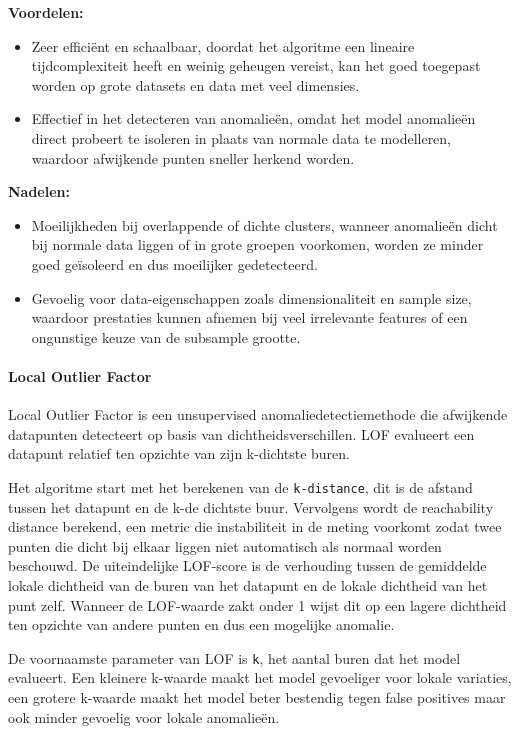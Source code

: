 \textbf{Voordelen:}
\begin{itemize}
    \item Zeer efficiënt en schaalbaar, doordat het algoritme een lineaire
    tijdcomplexiteit heeft en weinig geheugen vereist, kan het goed toegepast
    worden op grote datasets en data met veel dimensies.
    \item Effectief in het detecteren van anomalieën, omdat het model anomalieën
    direct probeert te isoleren in plaats van normale data te modelleren,
    waardoor afwijkende punten sneller herkend worden.
\end{itemize}

\textbf{Nadelen:}
\begin{itemize}
    \item Moeilijkheden bij overlappende of dichte clusters, wanneer anomalieën
    dicht bij normale data liggen of in grote groepen voorkomen, worden ze minder
    goed geïsoleerd en dus moeilijker gedetecteerd.
    \item Gevoelig voor data-eigenschappen zoals dimensionaliteit en sample size,
    waardoor prestaties kunnen afnemen bij veel irrelevante features of een
    ongunstige keuze van de subsample grootte.
\end{itemize}

\medskip

\paragraph{Local Outlier Factor}

Local Outlier Factor is een unsupervised anomaliedetectiemethode die afwijkende datapunten detecteert op basis van dichtheidsverschillen. LOF evalueert een datapunt relatief ten opzichte van zijn k-dichtste buren.

Het algoritme start met het berekenen van de \texttt{k-distance}, dit is de afstand tussen het datapunt en de k-de dichtste buur. 
Vervolgens wordt de reachability distance berekend, een metric die instabiliteit in de meting voorkomt zodat twee punten die dicht bij elkaar liggen niet automatisch als normaal worden beschouwd. 
De uiteindelijke LOF-score is de verhouding tussen de gemiddelde lokale dichtheid van de buren van het datapunt en de lokale dichtheid van het punt zelf. 
Wanneer de LOF-waarde zakt onder 1 wijst dit op een lagere dichtheid ten opzichte van andere punten en dus een mogelijke anomalie\autocite{Mavuduru2026}.

De voornaamste parameter van LOF is \texttt{k}, het aantal buren dat het model evalueert. 
Een kleinere k-waarde maakt het model gevoeliger voor lokale variaties, een grotere k-waarde maakt het model beter bestendig tegen false positives maar ook minder gevoelig voor lokale anomalieën.

